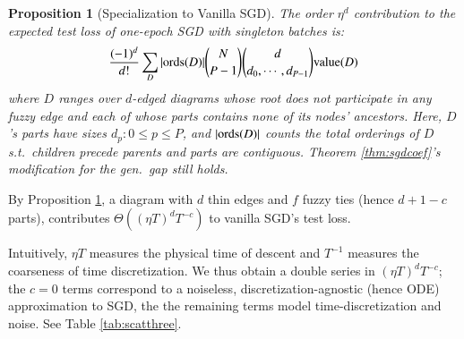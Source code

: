 \documentclass{article}
\theoremstyle{plain}
\newtheorem{prop}{Proposition}
\theoremstyle{definition}
\newtheorem{exm}{Example}
\newcommand{\wrap}[1]{\left(#1\right)}
\newcommand{\dvalue}{\text{\textnormal{value}}}
\newcommand{\ords}{\text{\textnormal{ords}}}
\begin{document}
        \begin{prop}[Specialization to Vanilla SGD] \label{prop:vanilla}
            The order $\eta^d$ contribution to the expected test loss of
            one-epoch SGD with singleton batches is:
            \begin{equation*}\label{eq:sgdbasiccoef}
                \frac{(-1)^d}{d!} \sum_{D} 
                |\ords(D)| {N \choose P-1} {d \choose d_0,\cdots,d_{P-1}}
                \dvalue(D)
            \end{equation*}
            where $D$ ranges over $d$-edged diagrams whose root
            does not participate in any fuzzy edge and each of whose parts contains
            none of its nodes' ancestors.  Here, $D$'s parts have sizes
            $d_p: 0\leq p\leq P$, and $|\ords(D)|$ counts the total
            orderings of $D$ s.t.\ children precede parents and parts are
            contiguous.
            Theorem \ref{thm:sgdcoef}'s modification for the gen.\ gap still
            holds.
        \end{prop}

        By Proposition \ref{prop:vanilla}, a diagram with $d$ thin edges and
        $f$ fuzzy ties (hence $d+1-c$ parts), contributes $\Theta\wrap{(\eta
        T)^d T^{-c}}$ to vanilla SGD's test loss.  
        
        Intuitively, $\eta T$ measures the physical time of descent and
        $T^{-1}$ measures the coarseness of time discretization.  We thus
        obtain a double series in $(\eta T)^d T^{-c}$; the $c=0$ terms
        correspond to a noiseless, discretization-agnostic (hence ODE)
        approximation to SGD, the the remaining terms model time-discretization
        and noise.  See Table \ref{tab:scatthree}. 

\end{document}
